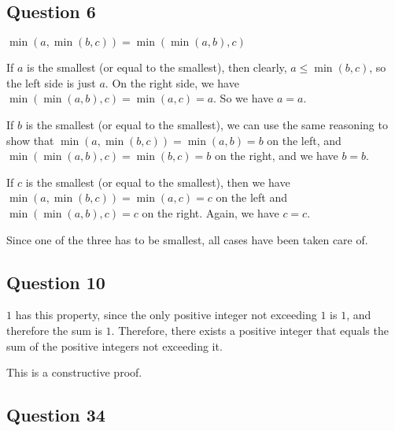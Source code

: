 \documentclass[12pt]{article}
\begin{document}
\subsection*{Question 6}

$\min(a, \min(b, c)) = \min(\min(a, b), c)$

If $a$ is the smallest (or equal to the smallest), then clearly, 
$a \leq \min(b, c)$, so the left side is just $a$. On the right side, we
have $\min(\min(a, b), c) = \min(a, c) = a$. So we have $a=a$.

If $b$ is the smallest (or equal to the smallest), we can use the same
reasoning to show that $\min(a, \min(b, c)) = \min(a, b) = b$ on the left,
and $\min(\min(a, b), c) = \min(b, c) = b$ on the right, and we have $b=b$.

If $c$ is the smallest (or equal to the smallest), then we have
$\min(a, \min(b,c)) = \min(a, c) = c$ on the left and $\min(\min(a, b), c) = c$
on the right. Again, we have $c = c$.

Since one of the three has to be smallest, all cases have been taken care of.

\subsection*{Question 10}

$1$ has this property, since the only positive integer not exceeding $1$ is $1$,
and therefore the sum is $1$. Therefore, there exists a positive integer that
equals the sum of the positive integers not exceeding it.

This is a constructive proof.

\subsection*{Question 34}
\end{document}
